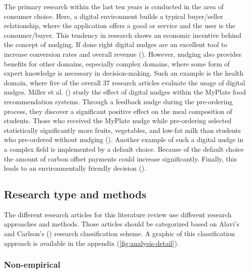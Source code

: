 The primary research within the last ten years is conducted in the area of consumer choice. Here, a digital environment builds a typical buyer/seller relationship, where the application offers a good or service and the user is the consumer/buyer. This tendency in research shows an economic incentive behind the concept of nudging. If done right digital nudges are an excellent tool to increase conversion rates and overall revenue (\cite{mirsch_making_2018}).
However, nudging also provides benefits for other domains, especially complex domains, where some form of expert knowledge is necessary in decision-making. Such an example is the health domain, where five of the overall 37 research articles evaluate the usage of digital nudges. Miller et al. (\citeyear{miller_effects_2016}) study the effect of digital nudges within the MyPlate food recommendation systems. Through a feedback nudge during the pre-ordering process, they discover a significant positive effect on the meal composition of students. Those who received the MyPlate nudge while pre-ordering selected statistically significantly more fruits, vegetables, and low-fat milk than students who pre-ordered without nudging (\cite{miller_effects_2016}).
Another example of such a digital nudge in a complex field is implemented by a default choice. Because of the default choice the amount of carbon offset payments could increase significantly. Finally, this leads to an environmentally friendly decision (\cite{szekely_nudging_2016}).


\subsection{Research type and methods}
The different research articles for this literature review use different research approaches and methods. Those articles should be categorized based on Alavi's and Carlson's (\citeyear{alavi_review_1992}) research classification scheme. A graphic of this classification approach is available in the appendix (\ref{fig:analysis-detail}).

\subsubsection{Non-empirical}

